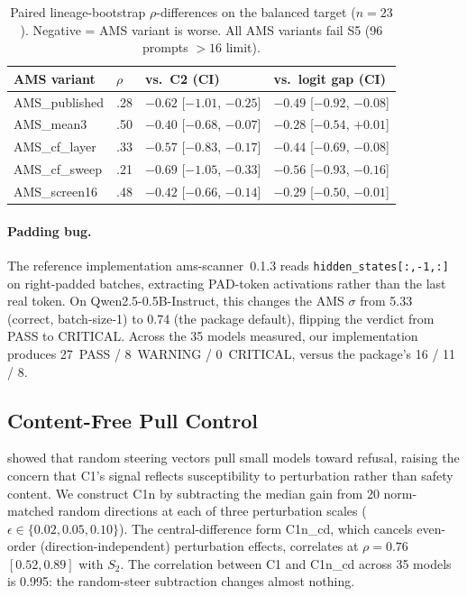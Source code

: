\documentclass[11pt,letterpaper]{article}
\begin{document}
\begin{table}[!htbp]
\centering
\small
\caption{Paired lineage-bootstrap $\rho$-differences on the balanced
target ($n = 23$). Negative = AMS variant is worse. All AMS variants fail
S5 (96 prompts $> 16$ limit).}
\label{tab:ams}
\begin{tabular}{@{}llll@{}}
\toprule
AMS variant & $\rho$ & vs.\ C2 (CI) & vs.\ logit gap (CI) \\
\midrule
AMS\_published & .28 & $-0.62$ [$-1.01$, $-0.25$] & $-0.49$ [$-0.92$, $-0.08$] \\
AMS\_mean3     & .50 & $-0.40$ [$-0.68$, $-0.07$] & $-0.28$ [$-0.54$, $+0.01$] \\
AMS\_cf\_layer & .33 & $-0.57$ [$-0.83$, $-0.17$] & $-0.44$ [$-0.69$, $-0.08$] \\
AMS\_cf\_sweep & .21 & $-0.69$ [$-1.05$, $-0.33$] & $-0.56$ [$-0.93$, $-0.16$] \\
AMS\_screen16  & .48 & $-0.42$ [$-0.66$, $-0.14$] & $-0.29$ [$-0.50$, $-0.01$] \\
\bottomrule
\end{tabular}
\end{table}

\paragraph{Padding bug.}
The reference implementation ams-scanner~0.1.3 reads
\texttt{hidden\_states[:,-1,:]} on right-padded batches, extracting
PAD-token activations rather than the last real token. On
Qwen2.5-0.5B-Instruct, this changes the AMS $\sigma$ from 5.33
(correct, batch-size-1) to 0.74 (the package default), flipping the
verdict from PASS to CRITICAL. Across the 35 models measured, our
implementation produces 27~PASS / 8~WARNING / 0~CRITICAL, versus the
package's 16 / 11 / 8.

\subsection{Content-Free Pull Control}
\label{sec:content_free}

\citet{Malla2026} showed that random steering vectors pull small models
toward refusal, raising the concern that C1's signal reflects
susceptibility to perturbation rather than safety content. We construct
C1n by subtracting the median gain from 20 norm-matched random directions
at each of three perturbation scales
($\epsilon \in \{0.02, 0.05, 0.10\}$). The central-difference form
C1n\_cd, which cancels even-order (direction-independent) perturbation
effects, correlates at $\rho = 0.76$ $[0.52, 0.89]$ with $S_2$. The
correlation between C1 and C1n\_cd across 35 models is 0.995: the
random-steer subtraction changes almost nothing.
\end{document}
